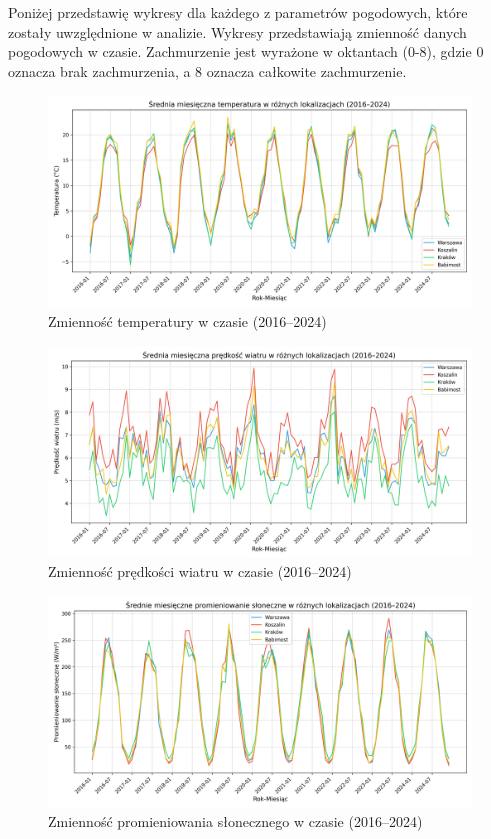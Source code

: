 Poniżej przedstawię wykresy dla każdego z parametrów pogodowych, które zostały uwzględnione w analizie. Wykresy przedstawiają zmienność danych pogodowych w czasie. Zachmurzenie jest wyrażone w oktantach (0-8), gdzie 0 oznacza brak zachmurzenia, a 8 oznacza całkowite zachmurzenie.

\begin{figure}[H]
    \centering
    \includegraphics[width=\textwidth]{../plots/data/temp_time_series_full.png}
    \caption{Zmienność temperatury w czasie (2016–2024)}
    \label{fig:temp-time-series-full}
\end{figure}

\begin{figure}[H]
    \centering
    \includegraphics[width=\textwidth]{../plots/data/wind_speed_time_series_full.png}
    \caption{Zmienność prędkości wiatru w czasie (2016–2024)}
    \label{fig:wind-speed-time-series-full}
\end{figure}

\begin{figure}[H]
    \centering
    \includegraphics[width=\textwidth]{../plots/data/solar_radiation_time_series_full.png}
    \caption{Zmienność promieniowania słonecznego w czasie (2016–2024)}
    \label{fig:solar-radiation-time-series-full}
\end{figure}

